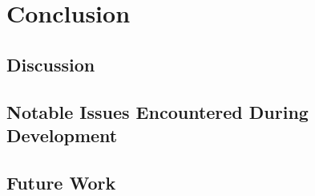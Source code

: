 \chapter{Conclusion}
\vspace{-1.6em}
%

\minitoc%
\thispagestyle{empty}
\newpage

\section{Discussion}
\section{Notable Issues Encountered During Development}
\section{Future Work}

